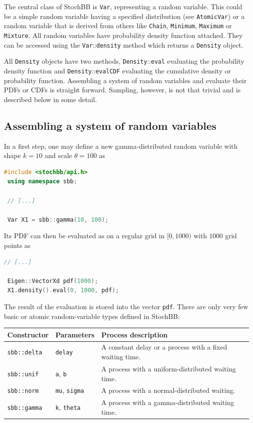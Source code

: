 \documentclass[a4paper, 10pt]{paper}
\newcommand{\code}[1]{\texttt{#1}}
\newcommand{\class}[1]{\code{#1}}
\newcommand{\method}[2]{\code{#1}::\code{#2}}
\newcommand{\function}[1]{\code{#1}}
\begin{document}
The central class of StochBB is \class{Var}, representing a random variable. This could be a
simple random variable having a specified distribution (see \class{AtomicVar}) or a random
variable that is derived from others like \class{Chain}, \class{Minimum}, \class{Maximum} or
\class{Mixture}. All random variables have probability density function attached. They can be accessed
using the \method{Var}{density} method which returns a \class{Density} object.

All \class{Density} objects have two methods, \method{Density}{eval} evaluating the probability
density function and \method{Density}{evalCDF} evaluating the cumulative density or probability
function. Assembling a system of random variables and evaluate their PDFs or CDFs is straight
forward. Sampling, however, is not that trivial and is described below in some detail.

\subsection{Assembling a system of random variables}
In a first step, one may define a new gamma-distributed random variable with shape $k=10$
and scale $\theta=100$ as
\begin{lstlisting}[language=C++]
 #include <stochbb/api.h>
 using namespace sbb;
 
 // [...]
 
 Var X1 = sbb::gamma(10, 100);
\end{lstlisting}

Its PDF can then be evaluated as on a regular grid in $[0,1000)$ with $1000$ grid points as
\begin{lstlisting}[language=C++]
 // [...]
 
 Eigen::VectorXd pdf(1000);
 X1.density().eval(0, 1000, pdf);
\end{lstlisting}

The result of the evaluation is stored into the vector \code{pdf}. There are only very few basic
or atomic random-variable types defined in StochBB:

\begin{tabular}{l|l|l}
 Constructor & Parameters & Process description \\ \hline
 \function{sbb::delta} & \code{delay} & A constant delay or a process with a fixed waiting time. \\
 \function{sbb::unif} & \code{a}, \code{b} & A process with a uniform-distributed waiting time. \\
 \function{sbb::norm} & \code{mu}, \code{sigma} & A process with a normal-distributed waiting. \\
 \function{sbb::gamma} & \code{k}, \code{theta} & A process with a gamma-distributed waiting time. \\
\end{tabular}
\end{document}
